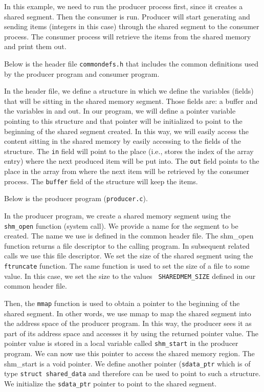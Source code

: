In this example, we need to run the producer process first, since it
creates a shared segment. Then the consumer is run. Producer will
start generating and sending items (integers in this case) through the
shared segment to the consumer process. The consumer process will
retrieve the items from the shared memory and print them out.

Below is the header file {\tt commondefs.h} that includes the common
definitions used by the producer program and consumer program.


In the header file, we define a structure in which we define the
variables (fields) that will be sitting in the shared memory
segment. Those fields are: a buffer and the variables in and out.  In
our program, we will define a pointer variable pointing to this
structure and that pointer will be initialized to point to the
beginning of the shared segment created. In this way, we will easily
access the content sitting in the shared memory by easily accessing to
the fields of the structure. The {\tt in} field will point to the
place (i.e., stores the index of the array entry) where the next
produced item will be put into. The {\tt out} field points to the
place in the array from where the next item will be retrieved by the
consumer process. The {\tt buffer} field of the structure will keep
the items.

Below is the producer program ({\tt producer.c}).


In the producer program, we create a shared memory segment using the
{\tt shm\_open} function (system call). We provide a name for the
segment to be created. The name we use is defined in the common header
file.  The shm\_open function returns a file descriptor to the calling
program. In subsequent related calls we use this file descriptor.  We
set the size of the shared segment using the {\tt ftruncate}
function. The same function is used to set the size of a file to some
value.  In this case, we set the size to the values {\tt
  SHAREDMEM\_SIZE} defined in our common header file.

Then, the {\tt mmap} function is used to obtain a pointer to the
beginning of the shared segment. In other words, we use mmap to map
the shared segment into the address space of the producer program. In
this way, the producer sees it as part of its address space and
accesses it by using the returned pointer value.  The pointer value is
stored in a local variable called {\tt shm\_start} in the producer
program. We can now use this pointer to access the shared memory
region. The shm\_start is a void pointer. We define another pointer
({\tt sdata\_ptr} which is of type {\tt struct shared\_data} and
therefore can be used to point to such a structure.  We initialize the
{\tt sdata\_ptr} pointer to point to the shared segment.

